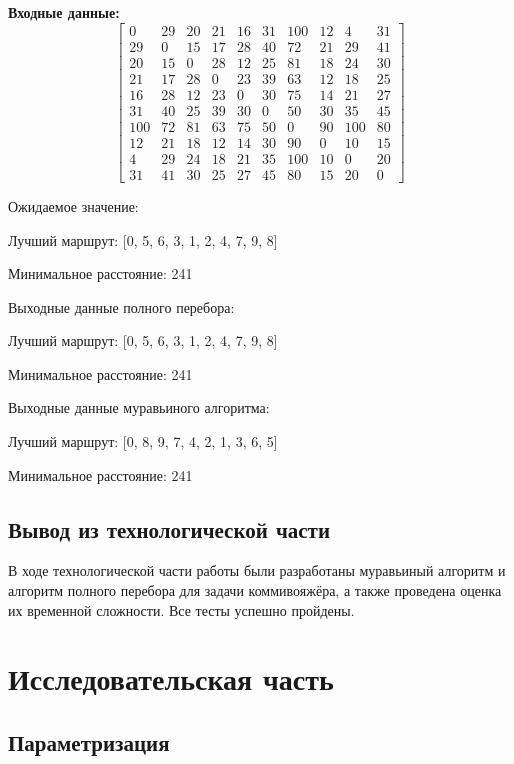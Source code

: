 \textbf{Входные данные:}
\[
\begin{bmatrix} 0 & 29 & 20 & 21 & 16 & 31 & 100 & 12 & 4 & 31 \\ 29 & 0 & 15 & 17 & 28 & 40 & 72 & 21 & 29 & 41 \\ 20 & 15 & 0 & 28 & 12 & 25 & 81 & 18 & 24 & 30 \\ 21 & 17 & 28 & 0 & 23 & 39 & 63 & 12 & 18 & 25 \\ 16 & 28 & 12 & 23 & 0 & 30 & 75 & 14 & 21 & 27 \\ 31 & 40 & 25 & 39 & 30 & 0 & 50 & 30 & 35 & 45 \\ 100 & 72 & 81 & 63 & 75 & 50 & 0 & 90 & 100 & 80 \\ 12 & 21 & 18 & 12 & 14 & 30 & 90 & 0 & 10 & 15 \\ 4 & 29 & 24 & 18 & 21 & 35 & 100 & 10 & 0 & 20 \\ 31 & 41 & 30 & 25 & 27 & 45 & 80 & 15 & 20 & 0 \end{bmatrix}
\]


Ожидаемое значение:

Лучший маршрут: [0, 5, 6, 3, 1, 2, 4, 7, 9, 8]

Минимальное расстояние: 241


Выходные данные полного перебора:

Лучший маршрут: [0, 5, 6, 3, 1, 2, 4, 7, 9, 8]  

Минимальное расстояние: 241


Выходные данные муравьиного алгоритма:

Лучший маршрут: [0, 8, 9, 7, 4, 2, 1, 3, 6, 5]  

Минимальное расстояние: 241

\section{Вывод из технологической части}

В ходе технологической части работы были разработаны муравьиный алгоритм и алгоритм полного перебора для задачи коммивояжёра, а также проведена оценка их временной сложности. Все тесты успешно пройдены.

\clearpage

\chapter{Исследовательская часть}

\section{Параметризация}

